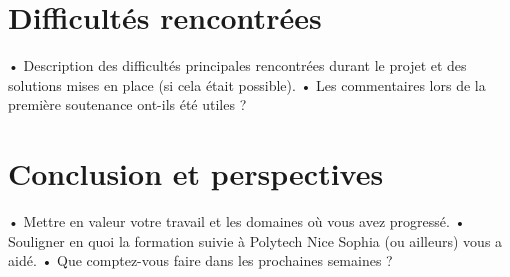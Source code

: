 \documentclass[11pt]{article}
\begin{document}
\pagebreak

\section{Difficultés rencontrées}

•	Description des difficultés principales rencontrées durant le projet et des solutions mises en place (si cela était possible).
•	Les commentaires lors de la première soutenance ont-ils été utiles ?

\pagebreak

\section{Conclusion et perspectives}

•	Mettre en valeur votre travail et les domaines où vous avez progressé. 
•	Souligner en quoi la formation suivie à Polytech Nice Sophia (ou ailleurs) vous a aidé.
•	Que comptez-vous faire dans les prochaines semaines ?

\pagebreak



\end{document}
